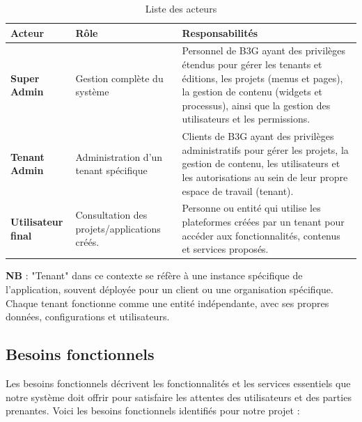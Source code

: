\begin{table}[h]
  \centering
  \captionsetup{justification=centering}
  \begin{tabular}{|p{}|p{}|p{}|}
    \hline
    \textbf{Acteur}            & \textbf{Rôle}                                & \textbf{Responsabilités}                                                                                                                                                                                                \\ \hline
    \textbf{Super Admin}       & Gestion complète du système                  & Personnel de B3G ayant des privilèges étendus pour gérer les tenants et éditions, les projets (menus et pages), la gestion de contenu (widgets et processus), ainsi que la gestion des utilisateurs et les permissions. \\ \hline
    \textbf{Tenant Admin}      & Administration d'un tenant spécifique        & Clients de B3G ayant des privilèges administratifs pour gérer les projets, la gestion de contenu, les utilisateurs et les autorisations au sein de leur propre espace de travail (tenant).                              \\ \hline
    \textbf{Utilisateur final} & Consultation des projets/applications créés. & Personne ou entité qui utilise les plateformes créées par un tenant pour accéder aux fonctionnalités, contenus et services proposés.                                                                                    \\ \hline
  \end{tabular}
  \caption{Liste des acteurs}
  \label{tab:actors}
\end{table}

\textbf{NB} : "Tenant" dans ce contexte se réfère à une instance spécifique de l'application, souvent déployée pour un client ou une organisation spécifique. Chaque tenant fonctionne comme une entité indépendante, avec ses propres données, configurations et utilisateurs.

\subsection{Besoins fonctionnels}

\hspace{\parindent} Les besoins fonctionnels décrivent les fonctionnalités et les services essentiels que notre système doit offrir pour satisfaire les attentes des utilisateurs et des parties prenantes. Voici les besoins fonctionnels identifiés pour notre projet :

